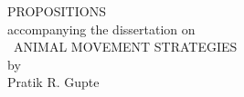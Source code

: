 \begingroup

\clearpage

\begin{doublespace}
    \begin{center}
        {\LARGE \textsf{PROPOSITIONS}} \\
        {\small accompanying the dissertation on}\\
        {\large \adftripleflourishleft~\textsf{ANIMAL MOVEMENT STRATEGIES}~\adftripleflourishright}\\
        by\\
        Pratik R. Gupte\\
    \end{center}
\end{doublespace}

